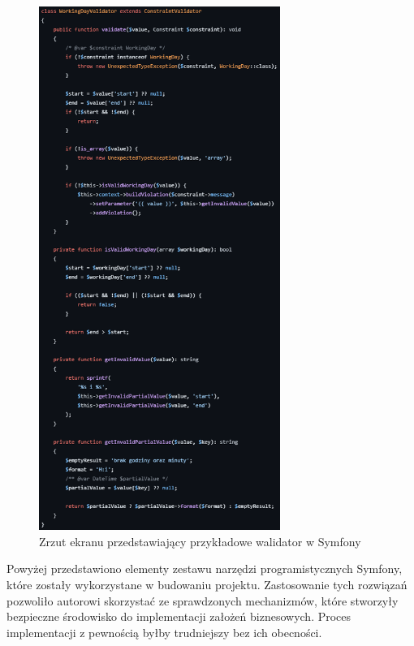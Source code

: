 \documentclass[12pt,oneside]{book}
\newcommand{\captionvspace}{\vspace{6pt}}
\begin{document}
    \begin{figure}[ht]
        \centering
        \includegraphics[width=0.7\textwidth]{includes/images/example-validator-before-migration.png}
        \captionvspace
        \caption{Zrzut ekranu przedstawiający przykładowe walidator w Symfony}
        \label{fig:example-sdiwpil-validator}
    \end{figure}

    Powyżej przedstawiono elementy zestawu narzędzi programistycznych Symfony, które zostały wykorzystane w budowaniu projektu. Zastosowanie tych rozwiązań pozwoliło autorowi skorzystać ze sprawdzonych mechanizmów, które stworzyły bezpieczne środowisko do implementacji założeń biznesowych. Proces implementacji z pewnością byłby trudniejszy bez ich obecności.
\end{document}
